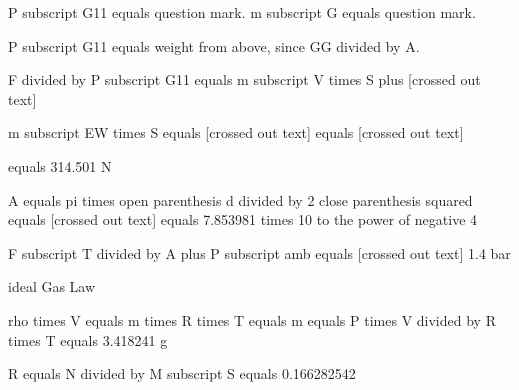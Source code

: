 P subscript G11 equals question mark. m subscript G equals question mark.

P subscript G11 equals weight from above, since GG divided by A.

F divided by P subscript G11 equals m subscript V times S plus [crossed out text]

m subscript EW times S equals [crossed out text] equals [crossed out text]

equals 314.501 N

A equals pi times open parenthesis d divided by 2 close parenthesis squared equals [crossed out text] equals 7.853981 times 10 to the power of negative 4

F subscript T divided by A plus P subscript amb equals [crossed out text] 1.4 bar

ideal Gas Law

rho times V equals m times R times T equals m equals P times V divided by R times T equals 3.418241 g

R equals N divided by M subscript S equals 0.166282542
